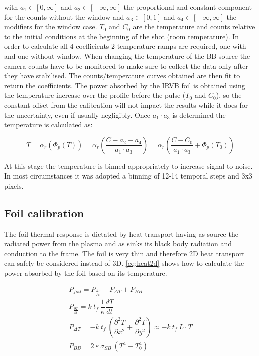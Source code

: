 with $a_1\in[0,\infty]$ and $a_2\in[-\infty,\infty]$ the proportional and constant component for the counts without the window and $a_3\in[0,1]$ and $a_4\in[-\infty,\infty]$ the modifiers for the window case. $T_0$ and $C_0$ are the temperature and counts relative to the initial conditions at the beginning of the shot (room temperature).
In order to calculate all 4 coefficients 2 temperature ramps are required, one with and one without window. When changing the temperature of the BB source the camera counts have to be monitored to make sure to collect the data only after they have stabilised.
The counts/temperature curves obtained are then fit to return the coefficients. The power absorbed by the IRVB foil is obtained using the temperature increase over the profile before the pulse ($T_0$ and $C_0$), so the constant offset from the calibration will not impact the results while it does for the uncertainty, even if usually negligibly.
Once $a_1 \cdot a_3$ is determined the temperature is calculated as:

\begin{equation}
T = {\alpha}_r ( {\Phi}_p(T)) = {\alpha}_r \left (\frac {C - a_2 - a_4} {a_1 \cdot a_3} \right ) = {\alpha}_r \left (\frac {C - C_0} {a_1 \cdot a_3} + {\Phi}_p (T_0) \right )
\label{eq:BBphotons4}
\end{equation}

At this stage the temperature is binned appropriately to increase signal to noise. In most circumstances it was adopted a binning of 12-14 temporal steps and 3x3 pixels.

\subsection{Foil calibration}
The foil thermal response is dictated by heat transport having as source the radiated power from the plasma and as sinks its black body radiation and conduction to the frame. The foil is very thin and therefore 2D heat transport can safely be considered instead of 3D. \autoref{eq:heat2d} shows how to calculate the power absorbed by the foil based on its temperature.

\begin{equation}
\begin{split}
P_{foil}= P_{\frac {\partial T} {\partial t}}+P_{\Delta T}+P_{BB}\\
P_{\frac {\partial T} {\partial t}}=k \: t_f \: \dfrac{1}{\kappa} \dfrac{dT}{dt} \\
 P_{\Delta T} = -k \: t_f \:  \left( \dfrac{\partial^2 T}{\partial x^2} + \dfrac{\partial^2 T}{\partial y^2} \right) \approx -k \: t_f \: L \cdot T \\ P_{BB} = 2 \: \varepsilon \: \sigma_{SB} \: (T^4 - T_0^4)
\label{eq:heat2d}
\end{split}
\end{equation}

